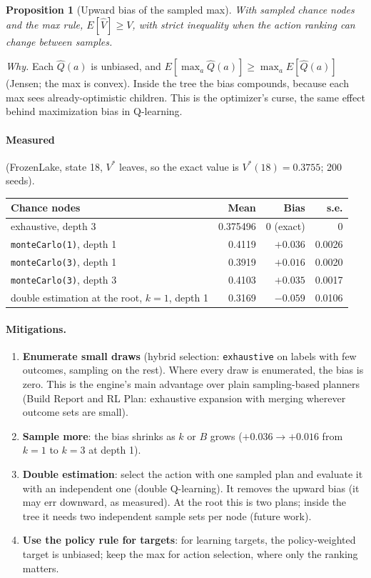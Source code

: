\documentclass[11pt]{article}
\newcommand{\code}[1]{\texttt{#1}}
\theoremstyle{plain}
\newtheorem{proposition}{Proposition}
\begin{document}
\begin{proposition}[Upward bias of the sampled max]
With sampled chance nodes and the max rule, $E[\hat V] \ge V$, with strict inequality when the action ranking can
change between samples.
\end{proposition}
\emph{Why.} Each $\hat Q(a)$ is unbiased, and $E[\max_a \hat Q(a)] \ge \max_a E[\hat Q(a)]$ (Jensen; the max is
convex). Inside the tree the bias compounds, because each max sees already-optimistic children. This is the
optimizer's curse, the same effect behind maximization bias in Q-learning.

\paragraph{Measured} (FrozenLake, state 18, $V^*$ leaves, so the exact value is $V^*(18)=0.3755$; 200 seeds).
\begin{center}
\small
\begin{tabular}{@{}lrrr@{}}
\toprule
\textbf{Chance nodes} & \textbf{Mean} & \textbf{Bias} & \textbf{s.e.}\\
\midrule
exhaustive, depth 3 & 0.375496 & 0 (exact) & 0\\
\code{monteCarlo(1)}, depth 1 & 0.4119 & $+0.036$ & 0.0026\\
\code{monteCarlo(3)}, depth 1 & 0.3919 & $+0.016$ & 0.0020\\
\code{monteCarlo(3)}, depth 3 & 0.4103 & $+0.035$ & 0.0017\\
double estimation at the root, $k=1$, depth 1 & 0.3169 & $-0.059$ & 0.0106\\
\bottomrule
\end{tabular}
\end{center}
\paragraph{Mitigations.}
\begin{enumerate}
\item \textbf{Enumerate small draws} (hybrid selection: \code{exhaustive} on labels with few outcomes, sampling on
  the rest). Where every draw is enumerated, the bias is zero. This is the engine's main advantage over plain
  sampling-based planners (Build Report and RL Plan: exhaustive expansion with merging wherever outcome sets are small).
\item \textbf{Sample more}: the bias shrinks as $k$ or $B$ grows ($+0.036\to+0.016$ from $k=1$ to $k=3$ at depth 1).
\item \textbf{Double estimation}: select the action with one sampled plan and evaluate it with an independent one
  (double Q-learning). It removes the upward bias (it may err downward, as measured). At the root this is two plans;
  inside the tree it needs two independent sample sets per node (future work).
\item \textbf{Use the policy rule for targets}: for learning targets, the policy-weighted target is unbiased; keep the
  max for action selection, where only the ranking matters.
\end{enumerate}
\end{document}
